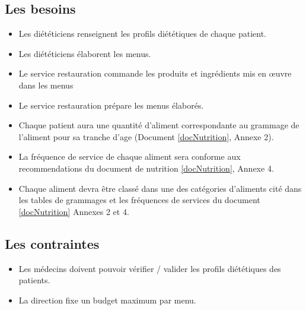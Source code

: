 \subsection{Les besoins}
\begin{itemize}
\item Les diététiciens renseignent les profils diététiques de chaque patient.
\item Les diététiciens élaborent les menus.
\item Le service restauration commande les produits et ingrédients mis en œuvre dans les menus
\item Le service restauration prépare les menus élaborés.
\item Chaque patient aura une quantité d'aliment correspondante au grammage de l'aliment pour sa tranche d'age (Document \ref{docNutrition}, Annexe 2).
\item La fréquence de service de chaque aliment sera conforme aux recommendations du document de nutrition \ref{docNutrition}, Annexe 4.
\item Chaque aliment devra être classé dans une des catégories d'aliments cité dans les tables de grammages et les fréquences de services du document \ref{docNutrition} Annexes 2 et 4.
\end{itemize}

\subsection{Les contraintes}
\begin{itemize}
\item Les médecins doivent pouvoir vérifier / valider les profils diététiques des patients.
\item La direction fixe un budget maximum par menu.
\end{itemize}

